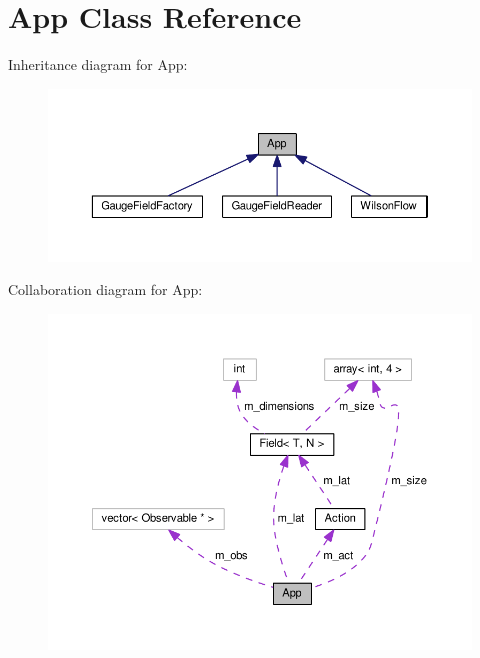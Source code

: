 \hypertarget{classApp}{}\section{App Class Reference}
\label{classApp}


Inheritance diagram for App\+:\nopagebreak
\begin{figure}[H]
\begin{center}
\leavevmode
\includegraphics[width=350pt]{classApp__inherit__graph}
\end{center}
\end{figure}


Collaboration diagram for App\+:\nopagebreak
\begin{figure}[H]
\begin{center}
\leavevmode
\includegraphics[width=350pt]{classApp__coll__graph}
\end{center}
\end{figure}
